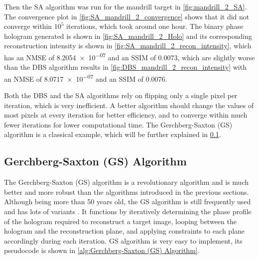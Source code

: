 Then the SA algorithm was run for the mandrill target in \cref{fig:mandrill_2_SA}. The convergence plot in \cref{fig:SA_mandrill_2_convergence} shows that it did not converge within $10^5$ iterations, which took around one hour. The binary phase hologram generated is shown in \cref{fig:SA_mandrill_2_Holo} and its corresponding reconstruction intensity is shown in \cref{fig:SA_mandrill_2_recon_intensity}, which has an NMSE of \num{8.2054e-07} and an SSIM of 0.0073, which are slightly worse than the DBS algorithm results in \cref{fig:DBS_mandrill_2_recon_intensity} with an NMSE of \num{8.0717e-07} and an SSIM of 0.0076.

Both the DBS and the SA algorithms rely on flipping only a single pixel per iteration, which is very inefficient. A better algorithm should change the values of most pixels at every iteration for better efficiency, and to converge within much fewer iterations for lower computational time. The Gerchberg-Saxton (GS) algorithm \cite{Gerchberg1972} is a classical example, which will be further explained in \cref{sec:Gerchberg-Saxton (GS) Algorithm}.


\subsection{Gerchberg-Saxton (GS) Algorithm}\label{sec:Gerchberg-Saxton (GS) Algorithm}
The Gerchberg-Saxton (GS) algorithm \cite{Gerchberg1972} is a revolutionary algorithm and is much better and more robust than the algorithms introduced in the previous sections. Although being more than 50 years old, the GS algorithm is still frequently used and has lots of variants \cite{Yang1994, WANG2017, Zhou2019}. It functions by iteratively determining the phase profile of the hologram required to reconstruct a target image, looping between the hologram and the reconstruction plane, and applying constraints to each plane accordingly during each iteration. GS algorithm is very easy to implement, its pseudocode is shown in \cref{alg:Gerchberg-Saxton (GS) Algorithm}.

